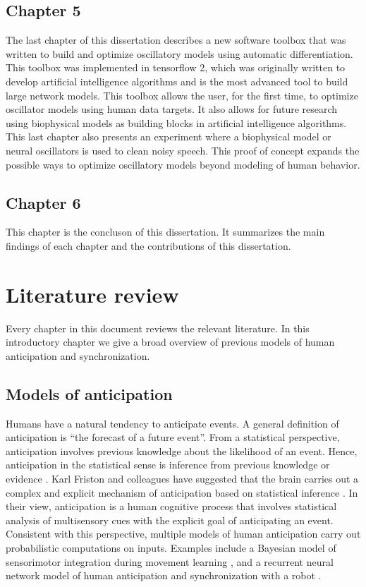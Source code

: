 \documentclass{report}
\begin{document}
\subsection{Chapter 5}
The last chapter of this dissertation describes a new software toolbox that was written to build and optimize oscillatory models using automatic differentiation. This toolbox was implemented in tensorflow 2, which was originally written to develop artificial intelligence algorithms and is the most advanced tool to build large network models. This toolbox allows the user, for the first time, to optimize oscillator models using human data targets. It also allows for future research using biophysical models as building blocks in artificial intelligence algorithms. This last chapter also presents an experiment where a biophysical model or neural oscillators is used to clean noisy speech. This proof of concept expands the possible ways to optimize oscillatory models beyond modeling of human behavior. 

\subsection{Chapter 6}
This chapter is the concluson of this dissertation. It summarizes the main findings of each chapter and the contributions of this dissertation.

\section{Literature review}

Every chapter in this document reviews the relevant literature. In this introductory chapter we give a broad overview of previous models of human anticipation and synchronization.

\subsection{Models of anticipation}
Humans have a natural tendency to anticipate events. A general definition of anticipation is “the forecast of a future event”. From a statistical perspective, anticipation involves previous knowledge about the likelihood of an event. Hence, anticipation in the statistical sense is inference from previous knowledge or evidence \cite{cox2006principles}. Karl Friston and colleagues have suggested that the brain carries out a complex and explicit mechanism of anticipation based on statistical inference \cite{maffei2017perceptual}. In their view, anticipation is a human cognitive process that involves statistical analysis of multisensory cues with the explicit goal of anticipating an event. Consistent with this perspective, multiple models of human anticipation carry out probabilistic computations on inputs. Examples include a Bayesian model of sensorimotor integration during movement learning \cite{kording2004bayesian}, and a recurrent neural network model of human anticipation and synchronization with a robot \cite{schydlo2018anticipation}. 
\end{document}
